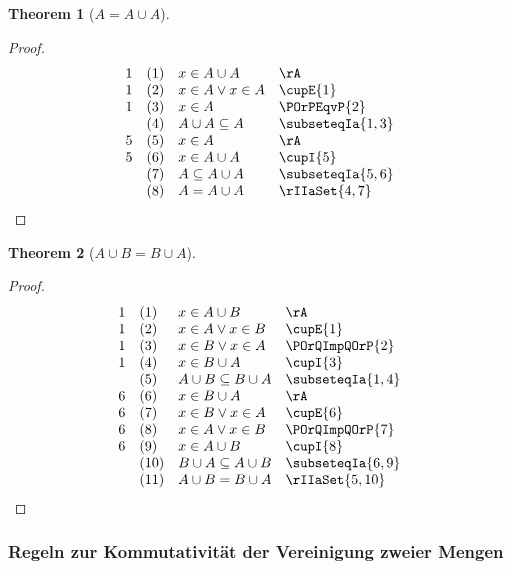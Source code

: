 \documentclass{book}
\theoremstyle{plain}
\newtheorem{theorem}{Theorem}
\theoremstyle{remark}
\theoremstyle{definition}
\begin{document}
\label{AEqualsAcuA}
\begin{theorem}[\(A = A \cup A\)]
\end{theorem}
\begin{proof}
	\[
	\begin{array}{llll}
		1 & (1) & x \in A \cup A & \rA \\
		1 & (2) & x \in A \lor x \in A & \cupE{1} \\
		1 & (3) & x \in A & \POrPEqvP{2} \\
		& (4) & A\cup A\subseteq A & \subseteqIa{1,3} \\
		5 & (5) & x\in A & \rA \\
		5 & (6) & x\in A\cup A & \cupI{5} \\
		& (7) & A\subseteq A\cup A & \subseteqIa{5,6} \\
		& (8) & A=A\cup A& \rIIaSet{4,7} \\
	\end{array}
	\]
\end{proof}

\label{AcuBEqualsBcuA}
\begin{theorem}[\(A \cup B = B \cup A\)]
\end{theorem}
\begin{proof}
	\[
	\begin{array}{llll}
		1 & (1) & x \in A \cup B & \rA \\
		1 & (2) & x \in A\lor x\in B & \cupE{1} \\
		1 & (3) & x \in B\lor x\in A & \POrQImpQOrP{2} \\
		1 & (4) & x \in B\cup A & \cupI{3} \\
		& (5) & A\cup B\subseteq B\cup A & \subseteqIa{1,4} \\
		6 & (6) & x \in B\cup A & \rA \\
		6 & (7) & x \in B\lor x\in A & \cupE{6} \\
		6 & (8) & x \in A\lor x\in B & \POrQImpQOrP{7} \\
		6 & (9) & x \in A\cup B & \cupI{8} \\
		& (10) & B\cup A\subseteq A\cup B & \subseteqIa{6,9} \\		
		& (11) & A\cup B = B\cup A & \rIIaSet{5,10} \\		
	\end{array}
	\]
\end{proof}

\subsubsection{Regeln zur Kommutativität der Vereinigung zweier Mengen}
\label{rule:kommCup}
\end{document}
